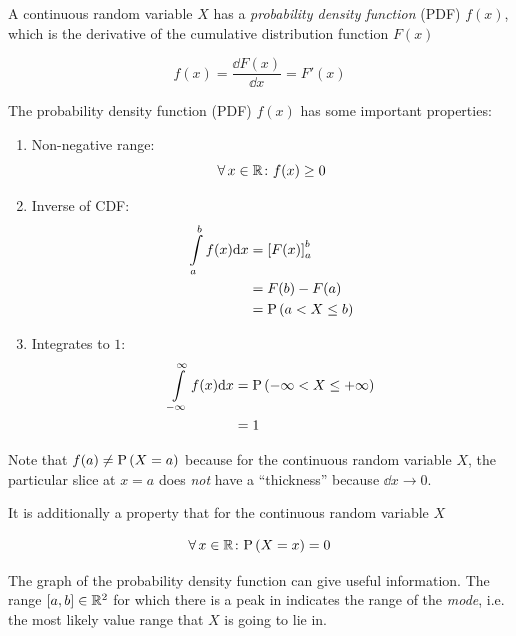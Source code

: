 \begin{definition}
    A continuous random variable $X$ has a \textit{probability density function} (PDF) $f(x)$, which is the derivative of the cumulative distribution function $F(x)$
    
    \begin{equation}
        f(x) = \frac{ \dd F(x) }{ \dd x } = F'(x)
    \end{equation}
    
    The probability density function (PDF) $f(x)$ has some important properties:

    \begin{enumerate}
        \item Non-negative range:
        \begin{equation}
            \operatorname{\forall} x \in \mathbb{R} \colon f(x) \ge 0
        \end{equation}
        \item Inverse of CDF:
        \begin{align}
            \int \limits_{a}^{b} f(x) \dd x
            &= \left[ F(x) \right]_{a}^{b} \\
            &= F(b) - F(a) \\
            &= \mathrm{P} \left( a < X \le b \right)
        \end{align}
        \item Integrates to $1$:
        \begin{align}
            \int \limits_{-\infty}^{\infty} f(x) \dd x
            &= \mathrm{P} \left( -\infty < X \le +\infty \right) \\
            &= 1
        \end{align}
    \end{enumerate}
\end{definition}

\begin{remark}
    Note that $f(a) \ne \mathrm{P} \left( X = a \right)$ because for the continuous random variable $X$, the particular slice at $x = a$ does \textit{not} have a \enquote{thickness} because $\dd x \to 0$.
    
    It is additionally a property that for the continuous random variable $X$
    
    \begin{equation}
        \operatorname{\forall} x \in \mathbb{R} \colon \mathrm{P} \left( X = x \right) = 0
    \end{equation}
\end{remark}

\begin{remark}
    The graph of the probability density function can give useful information. The range $[a, b] \in \mathbb{R}^2$ for which there is a peak in indicates the range of the \textit{mode}, i.e. the most likely value range that $X$ is going to lie in.
\end{remark}

